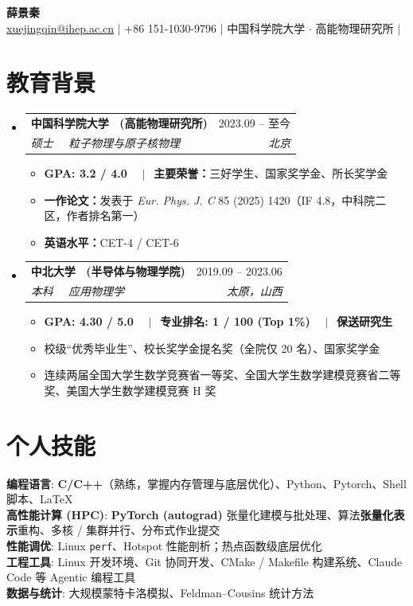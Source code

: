 \documentclass[a4paper,11pt]{article}
\makeatletter
\newcommand{\resumeItem}[1]{
  \item\small{{#1 \vspace{-1pt}}}
}
\newcommand{\resumeEducationHeading}[4]{
  \vspace{-2pt}\item
    \begin{tabular*}{0.97\textwidth}[t]{l@{\extracolsep{\fill}}r}
      \textbf{#1} & #2 \\
      \textit{\small #3} & \textit{\small #4} \\
    \end{tabular*}\vspace{-5pt}
}
\newcommand{\resumeSubHeadingListStart}{\begin{itemize}[leftmargin=0.15in, label={}]}
\newcommand{\resumeSubHeadingListEnd}{\end{itemize}}
\newcommand{\resumeItemListStart}{\begin{itemize}[leftmargin=*, label={\small\textbullet}]}
\newcommand{\resumeItemListEnd}{\end{itemize}\vspace{-2pt}}
\makeatother
\begin{document}
\begin{center}
    \textbf{\Huge { 薛景秦}} \\ \vspace{8pt}
    \small
    \href{mailto:xuejingqin@ihep.ac.cn}{\underline{xuejingqin@ihep.ac.cn}} $|$
    +86 151-1030-9796 $|$
    中国科学院大学 $\cdot$ 高能物理研究所 $|$
    
\end{center}

\section{教育背景}
  \resumeSubHeadingListStart
    \resumeEducationHeading
      {中国科学院大学 \ (高能物理研究所)}{2023.09 -- 至今}
      {硕士 \ \textbar \ 粒子物理与原子核物理}{北京}
      \resumeItemListStart
        \resumeItem{\textbf{GPA: 3.2 / 4.0} \ \ $|\ \ $ \textbf{主要荣誉：}三好学生、国家奖学金、所长奖学金}
        \resumeItem{\textbf{一作论文：}发表于 \textit{Eur. Phys. J. C} 85 (2025) 1420（IF 4.8，中科院二区，作者排名第一）}
        \resumeItem{\textbf{英语水平：}CET-4 / CET-6}
      \resumeItemListEnd
    \resumeEducationHeading
      {中北大学 \ (半导体与物理学院)}{2019.09 -- 2023.06}
      {本科 \ \textbar \ 应用物理学}{太原，山西}
      \resumeItemListStart
        \resumeItem{\textbf{GPA: 4.30 / 5.0} \ \ $|\ \ $ \textbf{专业排名: 1 / 100 (Top 1\%)} \ \ $|\ \ $ \textbf{保送研究生}}
        \resumeItem{校级“优秀毕业生”、校长奖学金提名奖（全院仅 20 名）、国家奖学金}
        \resumeItem{连续两届全国大学生数学竞赛省一等奖、全国大学生数学建模竞赛省二等奖、美国大学生数学建模竞赛 H 奖}
      \resumeItemListEnd
  \resumeSubHeadingListEnd

\section{个人技能}
 \begin{itemize}[leftmargin=0.15in, label={}]
    \small{\item{
     \textbf{编程语言}{: \textbf{C/C++}（熟练，掌握内存管理与底层优化）、Python、Pytorch、Shell 脚本、LaTeX} \\
     \textbf{高性能计算 (HPC)}{: \textbf{PyTorch (autograd)} 张量化建模与批处理、算法\textbf{张量化表示}重构、多核 / 集群并行、分布式作业提交} \\
     \textbf{性能调优}{: Linux \texttt{perf}、Hotspot 性能剖析；热点函数级底层优化} \\
     \textbf{工程工具}{: Linux 开发环境、Git 协同开发、CMake / Makefile 构建系统、Claude Code 等 Agentic 编程工具} \\
     \textbf{数据与统计}{: 大规模蒙特卡洛模拟、Feldman--Cousins 统计方法}
    }}
 \end{itemize}
\end{document}
